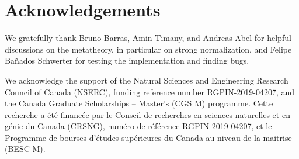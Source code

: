 \makeatletter
\renewcommand\@seccntformat[1]{}
\makeatother

\section{Acknowledgements}

We gratefully thank Bruno Barras, Amin Timany, and Andreas Abel for helpful discussions on the metatheory,
in particular on strong normalization,
and Felipe Ba\~nados Schwerter for testing the implementation and finding bugs.

We acknowledge the support of the Natural Sciences and Engineering Research Council of Canada (NSERC), funding reference number RGPIN-2019-04207,
and the Canada Graduate Scholarships -- Master’s (CGS M) programme.
Cette recherche a \'et\'e financ\'ee par le Conseil de recherches en sciences naturelles et en g\'enie du Canada (CRSNG), num\'ero de r\'ef\'erence RGPIN-2019-04207,
et le Programme de bourses d’\'etudes sup\'erieures du Canada au niveau de la maitrise (BESC M).
